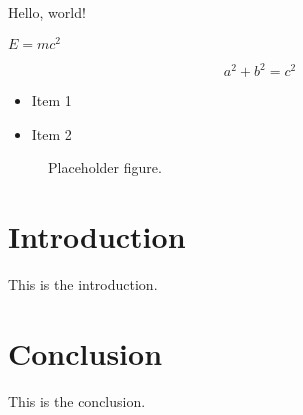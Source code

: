 \documentclass{article}
\begin{document}
Hello, world!

$E=mc^2$

\begin{equation}
a^2 + b^2 = c^2
\end{equation}

\begin{itemize}
    \item Item 1
    \item Item 2
\end{itemize}

\begin{figure}[h]
    \centering
    \caption{Placeholder figure.}
    \label{fig:placeholder}
\end{figure}

\section{Introduction}

This is the introduction.

\section{Conclusion}

This is the conclusion.
\end{document}
